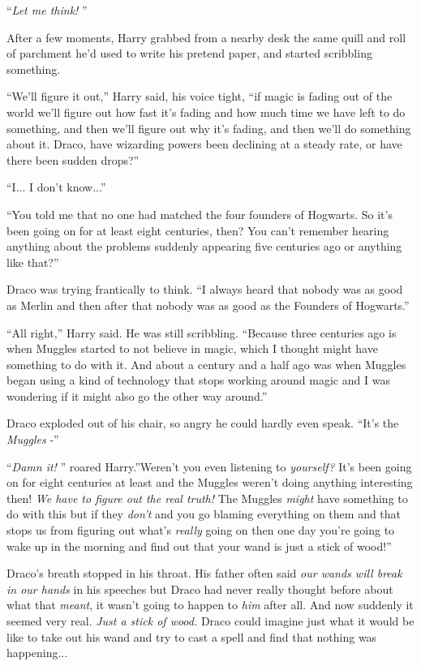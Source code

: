 ``\emph{Let me think!} ''

After a few moments, Harry grabbed from a nearby desk the same quill and
roll of parchment he'd used to write his pretend paper, and started
scribbling something.

``We'll figure it out,'' Harry said, his voice tight, ``if magic is
fading out of the world we'll figure out how fast it's fading and how
much time we have left to do something, and then we'll figure out why
it's fading, and then we'll do something about it. Draco, have wizarding
powers been declining at a steady rate, or have there been sudden
drops?''

``I... I don't know...''

``You told me that no one had matched the four founders of Hogwarts. So
it's been going on for at least eight centuries, then? You can't
remember hearing anything about the problems suddenly appearing five
centuries ago or anything like that?''

Draco was trying frantically to think. ``I always heard that nobody was
as good as Merlin and then after that nobody was as good as the Founders
of Hogwarts.''

``All right,'' Harry said. He was still scribbling. ``Because three
centuries ago is when Muggles started to not believe in magic, which I
thought might have something to do with it. And about a century and a
half ago was when Muggles began using a kind of technology that stops
working around magic and I was wondering if it might also go the other
way around.''

Draco exploded out of his chair, so angry he could hardly even speak.
``It's the \emph{Muggles} -''

``\emph{Damn it!} '' roared Harry.''Weren't you even listening to
\emph{yourself?} It's been going on for eight centuries at least and the
Muggles weren't doing anything interesting then! \emph{We have to figure
out the real truth!} The Muggles \emph{might} have something to do with
this but if they \emph{don't} and you go blaming everything on them and
that stops us from figuring out what's \emph{really} going on then one
day you're going to wake up in the morning and find out that your wand
is just a stick of wood!''

Draco's breath stopped in his throat. His father often said \emph{our
wands will break in our hands} in his speeches but Draco had never
really thought before about what that \emph{meant}, it wasn't going to
happen to \emph{him} after all. And now suddenly it seemed very real.
\emph{Just a stick of wood.} Draco could imagine just what it would be
like to take out his wand and try to cast a spell and find that nothing
was happening...


